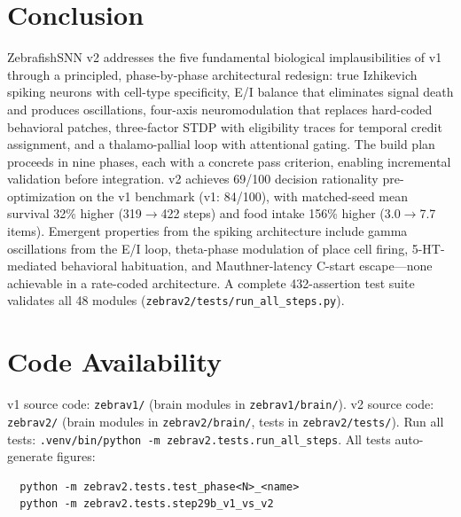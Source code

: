 \documentclass[11pt,a4paper]{article}
\begin{document}
\section{Conclusion}

ZebrafishSNN v2 addresses the five fundamental biological implausibilities
of v1 through a principled, phase-by-phase architectural redesign:
true Izhikevich spiking neurons with cell-type specificity,
E/I balance that eliminates signal death and produces oscillations,
four-axis neuromodulation that replaces hard-coded behavioral patches,
three-factor STDP with eligibility traces for temporal credit assignment,
and a thalamo-pallial loop with attentional gating.
The build plan proceeds in nine phases, each with a concrete pass criterion,
enabling incremental validation before integration.
v2 achieves 69/100 decision rationality pre-optimization on the v1 benchmark
(v1: 84/100), with matched-seed mean survival 32\% higher (319$\to$422 steps)
and food intake 156\% higher (3.0$\to$7.7 items).
Emergent properties from the spiking architecture include gamma oscillations
from the E/I loop, theta-phase modulation of place cell firing,
5-HT-mediated behavioral habituation, and Mauthner-latency C-start escape---none
achievable in a rate-coded architecture.
A complete 432-assertion test suite validates all 48 modules
(\texttt{zebrav2/tests/run\_all\_steps.py}).

\section{Code Availability}

v1 source code: \texttt{zebrav1/} (brain modules in \texttt{zebrav1/brain/}).
v2 source code: \texttt{zebrav2/} (brain modules in \texttt{zebrav2/brain/}, tests in \texttt{zebrav2/tests/}).
Run all tests: \texttt{.venv/bin/python -m zebrav2.tests.run\_all\_steps}.
All tests auto-generate figures:
\begin{verbatim}
  python -m zebrav2.tests.test_phase<N>_<name>
  python -m zebrav2.tests.step29b_v1_vs_v2
\end{verbatim}
\end{document}
